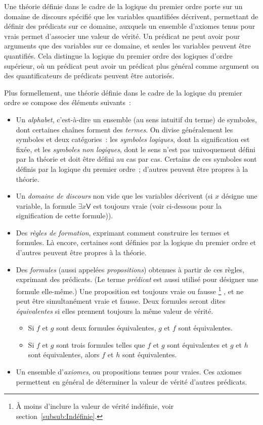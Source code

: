 Une théorie définie dans le cadre de la logique du premier ordre porte sur un domaine de discours spécifié que les variables quantifiées décrivent, permettant de définir des prédicats sur ce domaine, auxquels un ensemble d'axiomes tenus pour vrais permet d'associer une valeur de vérité. 
Un prédicat ne peut avoir pour arguments que des variables sur ce domaine, et seules les variables peuvent être quantifiés. 
Cela distingue la logique du premier ordre des logiques d'ordre supérieur, où un prédicat peut avoir un prédicat plus général comme argument ou des quantificateurs de prédicats peuvent être autorisés.

Plus formellement, une théorie définie dans le cadre de la logique du premier ordre se compose des éléments suivants : 
\begin{itemize}[nosep]
    \item Un \textit{alphabet}, c'est-à-dire un ensemble (au sens intuitif du terme) de symboles, dont certaines chaînes forment des \textit{termes}. 
          On divise généralement les symboles et deux catégories : les \textit{symboles logiques}, dont la signification est fixée, et les \textit{symboles non logiques}, dont le sens n'est pas univoquement défini par la théorie et doit être défini au cas par cas. 
          Certains de ces symboles sont définis par la logique du premier ordre ; d'autres peuvent être propres à la théorie. 
    \item Un \textit{domaine de discours} non vide que les variables décrivent (si $x$ désigne une variable, la formule $\exists x \mathsf{V}$ est toujours vraie (voir ci-dessous pour la signification de cette formule)).
    \item Des \textit{règles de formation}, exprimant comment construire les termes et formules. 
          Là encore, certaines sont définies par la logique du premier ordre et d'autres peuvent être propres à la théorie.
    \item Des \textit{formules} (aussi appelées \textit{propositions}) obtenues à partir de ces règles, exprimant des prédicats. 
        (Le terme \textit{prédicat} est aussi utilisé pour désigner une formule elle-même.)
        Une proposition est toujours vraie ou fausse%
        \footnote{À moins d'inclure la valeur de vérité indéfinie, voir section~\ref{subsub:Indéfinie}.}%
        , et ne peut être simultanément vraie et fausse. 
        Deux formules seront dites \textit{équivalentes} si elles prennent toujours la même valeur de vérité. 
        \begin{itemize}[nosep]
            \item Si $f$ et $g$ sont deux formules équivalentes, $g$ et $f$ sont équivalentes.
            \item Si $f$ et $g$ sont trois formules telles que $f$ et $g$ sont équivalentes et $g$ et $h$ sont équivalentes, alors $f$ et $h$ sont équivalentes.
        \end{itemize}
    \item Un ensemble d'\textit{axiomes}, ou propositions tenues pour vraies. 
          Ces axiomes permettent en général de déterminer la valeur de vérité d'autres prédicats.
\end{itemize}

